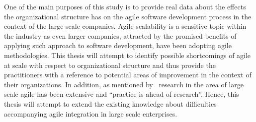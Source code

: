 \documentclass[paper=a4, fontsize=11pt]{scrartcl}
\numberwithin{equation}{section}		%
\numberwithin{figure}{section}			%
\numberwithin{table}{section}			%
\newcommand{\quotes}[1]{``#1''}
\begin{document}
One of the main purposes of this study is to provide real data about the effects the organizational structure has on the agile software development process in the context of the large scale companies.
Agile scalability is a sensitive topic within the industry as even larger companies, attracted by the promised benefits of applying such approach to software development, have been adopting agile methodologies. This thesis will attempt to identify possible shortcomings of agile at scale with respect to organizational structure and thus provide the practitioners with a reference to potential areas of improvement in the context of their organizations. In addition, as mentioned by~\citet{ding2013research} research in the area of large scale agile has been extensive and \quotes{practice is ahead of research}. Hence, this thesis will attempt to extend the existing knowledge about difficulties accompanying agile integration in large scale enterprises.

\pagebreak



\end{document}
